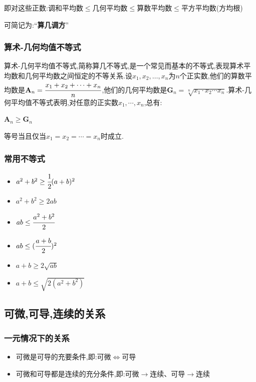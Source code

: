 {{{即对这些正数:调和平均数$\leq$几何平均数$\leq$算数平均数$\leq$平方平均数(方均根)

可简记为:“{\bfseries 算几调方}”
}%

\subsubsection{算术-几何均值不等式}{
    算术-几何平均值不等式,简称算几不等式,是一个常见而基本的不等式,表现算术平均数和几何平均数之间恒定的不等关系.设$x_1,x_2,\dots,x_n$为$n$个正实数,他们的算数平均数是$\mathbf{A}_n = \cfrac{x_1 + x_2 + \dotsm + x_n}{n}$,他们的几何平均数是$\mathbf{G}_n = \sqrt[n]{x_1\cdot x_2 \dotsm x_n}$.算术-几何平均值不等式表明,对任意的正实数$x_1,\dotsm,x_n$,总有:

    \begin{center}
        $\mathbf{A}_n\geq\mathbf{G}_n$
    \end{center}

    等号当且仅当$x_1 = x_2 = \dotsm = x_n$时成立.

}%

\subsubsection{常用不等式}{
    \begin{itemize}
        \item $a^2 + b^2 \geq \cfrac{1}{2}(a + b)^2$
        \item $a^2 + b^2 \geq 2ab$
        \item $ab \leq \cfrac{a^2 + b^2}{2}$
        \item $ab \leq (\cfrac{a + b}{2})^2$
        \item $a + b \geq 2\sqrt{ab}$
        \item $a + b \leq \sqrt{2(a^2 + b^2)}$
    \end{itemize}
}%

}%

\subsection{可微,可导,连续的关系}{

    \subsubsection{一元情况下的关系}{
        \begin{itemize}
            \item 可微是可导的充要条件,即:可微$\Leftrightarrow$可导
            \item 可微和可导都是连续的充分条件,即:可微$\rightarrow$连续、可导$\rightarrow$连续
        \end{itemize}

}}}
